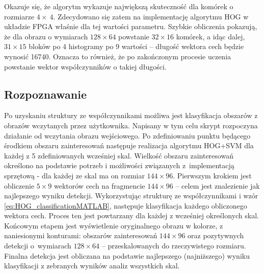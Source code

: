 Okazuje się, że algorytm wykazuje największą skuteczność dla komórek o rozmiarze $4\times~4$. 
Zdecydowano się zatem na implementację algorytmu HOG w układzie FPGA właśnie dla tej wartości parametru. 
Szybkie obliczenia pokazują, że dla obrazu o wymiarach $128\times 64$ powstanie $32\times 16$ komórek, a idąc dalej, $31\times 15$ bloków po 4 histogramy po 9 wartości -- długość wektora cech będzie wynosić 16740. 
Oznacza to również, że po zakończonym procesie uczenia powstanie wektor współczynników o takiej długości.




\subsection{Rozpoznawanie}

Po uzyskaniu struktury ze współczynnikami możliwa jest klasyfikacja obszarów z obrazów wczytanych przez użytkownika.
Napisany w tym celu skrypt rozpoczyna działanie od wczytania obrazu wejściowego. 
Po zdefiniowaniu punktu będącego środkiem obszaru zainteresowań następuje realizacja algorytmu HOG+SVM dla każdej z 5 zdefiniowanych wcześniej skal. Wielkość obszaru zainteresowań określono na podstawie potrzeb i możliwości związanych z~implementacją sprzętową - dla każdej ze skal ma on rozmiar $144 \times 96$.
Pierwszym krokiem jest obliczenie $5\times 9$ wektorów cech na fragmencie $144 \times 96$ -- celem jest znalezienie jak najlepszego wyniku detekcji.  %
Wykorzystując strukturę ze współczynnikami i wzór \ref{eq:HOG_classificationMATLAB}, następuje klasyfikacja każdego obliczonego wektora cech. %
Proces ten jest powtarzany dla każdej z wcześniej określonych skal. 
Końcowym etapem jest wyświetlenie oryginalnego obrazu w kolorze, z naniesionymi konturami: obszarów zainteresowań $144\times 96$ oraz pozytywnych detekcji o~wymiarach $128\times 64$ -- przeskalowanych do rzeczywistego rozmiaru. 
Finalna detekcja jest obliczana na podstawie najlepszego (najniższego) wyniku klasyfikacji z zebranych wyników analiz wszystkich skal.

